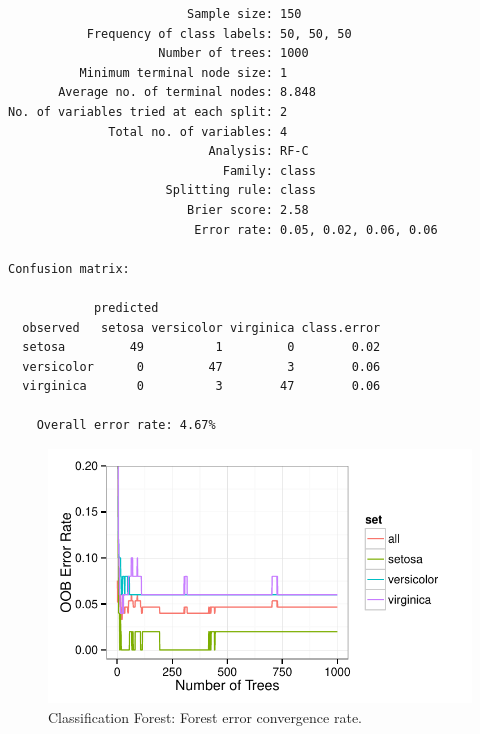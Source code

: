 \documentclass[nojss]{jss}\usepackage[]{graphicx}\usepackage[]{color}
\makeatletter
\def\maxwidth{ %
  \ifdim\Gin@nat@width>\linewidth
    \linewidth
  \else
    \Gin@nat@width
  \fi
}
\newenvironment{kframe}{%
 \def\at@end@of@kframe{}%
 \ifinner\ifhmode%
  \def\at@end@of@kframe{\end{minipage}}%
  \begin{minipage}{\columnwidth}%
 \fi\fi%
 \def\FrameCommand##1{\hskip\@totalleftmargin \hskip-\fboxsep
 \colorbox{shadecolor}{##1}\hskip-\fboxsep
     \hskip-\linewidth \hskip-\@totalleftmargin \hskip\columnwidth}%
 \MakeFramed {\advance\hsize-\width
   \@totalleftmargin\z@ \linewidth\hsize
   \@setminipage}}%
 {\par\unskip\endMakeFramed%
 \at@end@of@kframe}
\newenvironment{knitrout}{}{} %
\makeatother
\begin{document}

\begin{knitrout}\footnotesize
{}\color{fgcolor}\begin{kframe}
\begin{verbatim}
                         Sample size: 150
           Frequency of class labels: 50, 50, 50
                     Number of trees: 1000
          Minimum terminal node size: 1
       Average no. of terminal nodes: 8.848
No. of variables tried at each split: 2
              Total no. of variables: 4
                            Analysis: RF-C
                              Family: class
                      Splitting rule: class
                         Brier score: 2.58 
                          Error rate: 0.05, 0.02, 0.06, 0.06

Confusion matrix:

            predicted
  observed   setosa versicolor virginica class.error
  setosa         49          1         0        0.02
  versicolor      0         47         3        0.06
  virginica       0          3        47        0.06

	Overall error rate: 4.67% 
\end{verbatim}
\end{kframe}\begin{figure}[!htpb]


{\centering \includegraphics[width=\maxwidth]{figure/beamer-iris-rf-error-1} 

}

\caption[Classification Forest]{Classification Forest: Forest error convergence rate.\label{fig:iris-rf-error}}
\end{figure}


\end{knitrout}
\end{document}
